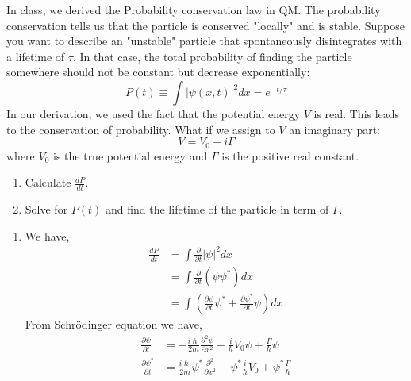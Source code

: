 \documentclass[addpoints]{exam}
\theoremstyle{mytheoremstyle}
\theoremstyle{mytheoremstyle}
\theoremstyle{myproblemstyle}
\begin{document}
\begin{questions}
	\question[15] In class, we derived the Probability conservation law in QM. The probability conservation tells us that the particle is conserved "locally" and is stable. Suppose you want to describe an "unstable" particle that spontaneously disintegrates with a lifetime of \(\tau\). In that case, the total probability of finding the particle somewhere should not be constant but decrease exponentially: \[P(t)\equiv \int |\psi(x,t)|^2 dx=e^{-t/\tau}\] In our derivation, we used the fact that the potential energy \(V\) is real. This leads to the conservation of probability. What if we assign to \(V\) an imaginary part: \[V=V_0-i\Gamma\] where \(V_0\) is the true potential energy and \(\Gamma\) is the positive real constant.
	\begin{enumerate}
		\item Calculate \(\displaystyle\frac{dP}{dt}\).
		\item Solve for \(P(t)\) and find the lifetime of the particle in term of \(\Gamma\).
	\end{enumerate}
	\begin{solution}
		\begin{enumerate}
			\item We have,
			      \begin{equation*}
				      \begin{aligned}
					      \frac{dP}{dt} & = \int \frac{\partial}{\partial t}|\psi|^2dx                                                          \\
					                    & = \int \frac{\partial}{\partial t}\left(\psi\psi^{*}\right)dx                                         \\
					                    & = \int \left(\frac{\partial\psi}{\partial t}\psi^{*}+\frac{\partial\psi^{*}}{\partial t}\psi\right)dx
				      \end{aligned}
			      \end{equation*}
			      From Schrödinger equation we have,
			      \begin{equation*}
				      \begin{aligned}
					      \frac{\partial\psi}{\partial t}     & = -\frac{i\hslash}{2m}\frac{\partial^2\psi}{\partial x^2}+\frac{i}{\hslash}V_0\psi+\frac{\Gamma}{\hslash}\psi            \\
					      \frac{\partial\psi^{*}}{\partial t} & = \frac{i\hslash}{2m}\psi^{*}\frac{\partial^2}{\partial x^2}-\psi^{*}\frac{i}{\hslash}V_0+\psi^{*}\frac{\Gamma}{\hslash}
				      \end{aligned}

\end{equation*}
\end{enumerate}
\end{solution}
\end{questions}
\end{document}
